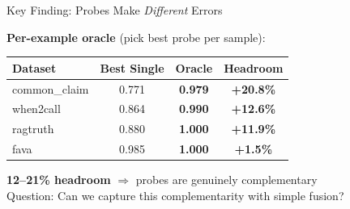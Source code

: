 \documentclass[aspectratio=169,14pt]{beamer}
\begin{document}
\begin{frame}{Key Finding: Probes Make \textit{Different} Errors}

\centering
\textbf{Per-example oracle} (pick best probe per sample):

\vspace{0.5em}
\begin{tabular}{l c c c}
\toprule
\textbf{Dataset} & \textbf{Best Single} & \textbf{Oracle} & \textbf{Headroom} \\
\midrule
common\_claim & 0.771 & \textbf{0.979} & \textcolor{wingreen}{\textbf{+20.8\%}} \\
when2call & 0.864 & \textbf{0.990} & \textcolor{wingreen}{\textbf{+12.6\%}} \\
ragtruth & 0.880 & \textbf{1.000} & \textcolor{wingreen}{\textbf{+11.9\%}} \\
fava & 0.985 & \textbf{1.000} & \textcolor{wingreen}{\textbf{+1.5\%}} \\
\bottomrule
\end{tabular}

\vspace{1.5em}
\textcolor{primary}{\textbf{12--21\% headroom}} $\Rightarrow$ probes are genuinely complementary\\
\vspace{0.3em}
{\small Question: Can we capture this complementarity with simple fusion?}

\end{frame}
\end{document}
